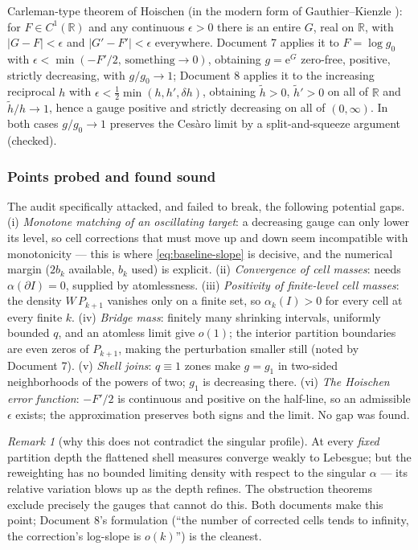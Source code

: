 \documentclass[11pt,oneside]{article}
\theoremstyle{definition}
\theoremstyle{remark}
\newtheorem{remark}[theorem]{Remark}
\newcommand{\R}{\mathbb R}
\newcommand{\e}{\mathrm e}
\begin{document}
\begin{enumerate}
Carleman-type theorem of Hoischen (in the modern form of
Gauthier--Kienzle \cite{gauthier-kienzle,hoischen}): for
$F\in C^1(\R)$ and any continuous $\epsilon>0$ there is an entire $G$,
real on $\R$, with $|G-F|<\epsilon$ and $|G'-F'|<\epsilon$ everywhere.
Document 7 applies it to $F=\log g_0$ with
$\epsilon<\min(-F'/2,\,\text{something}\to0)$, obtaining
$g=\e^G$ zero-free, positive, strictly decreasing, with
$g/g_0\to1$; Document 8 applies it to the increasing reciprocal $h$
with $\epsilon<\frac12\min(h,h',\delta h)$, obtaining
$\widetilde h>0$, $\widetilde h'>0$ on all of $\R$ and
$\widetilde h/h\to1$, hence a gauge positive and strictly decreasing on
all of $(0,\infty)$.  In both cases $g/g_0\to1$ preserves the Ces\`aro
limit by a split-and-squeeze argument (checked).
\end{enumerate}

\subsubsection*{Points probed and found sound}

The audit specifically attacked, and failed to break, the following
potential gaps.  (i) \emph{Monotone matching of an oscillating target}:
a decreasing gauge can only lower its level, so cell corrections that
must move up and down seem incompatible with monotonicity --- this is
where \eqref{eq:baseline-slope} is decisive, and the numerical margin
($2b_k$ available, $b_k$ used) is explicit.  (ii) \emph{Convergence of
cell masses}: needs $\alpha(\partial I)=0$, supplied by atomlessness.
(iii) \emph{Positivity of finite-level cell masses}: the density
$W\,P_{k+1}$ vanishes only on a finite set, so
$\alpha_k(I)>0$ for every cell at every finite $k$.  (iv) \emph{Bridge
mass}: finitely many shrinking intervals, uniformly bounded $q$, and an
atomless limit give $o(1)$; the interior partition boundaries are even
zeros of $P_{k+1}$, making the perturbation smaller still (noted by
Document 7).  (v) \emph{Shell joins}: $q\equiv1$ zones make $g=g_1$
in two-sided neighborhoods of the powers of two; $g_1$ is decreasing
there.  (vi) \emph{The Hoischen error function}: $-F'/2$ is continuous
and positive on the half-line, so an admissible $\epsilon$ exists; the
approximation preserves both signs and the limit.  No gap was found.

\begin{remark}[why this does not contradict the singular profile]
At every \emph{fixed} partition depth the flattened shell measures
converge weakly to Lebesgue; but the reweighting has no bounded
limiting density with respect to the singular $\alpha$ --- its relative
variation blows up as the depth refines.  The obstruction theorems
exclude precisely the gauges that cannot do this.  Both documents make
this point; Document 8's formulation (``the number of corrected cells
tends to infinity, the correction's log-slope is $o(k)$'') is the
cleanest.
\end{remark}
\end{document}
